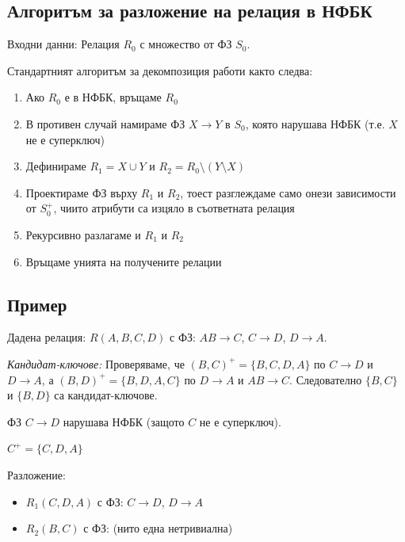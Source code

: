 \documentclass{scrartcl}
\begin{document}
\begin{FlushLeft}
\section{Алгоритъм за разложение на релация в НФБК}

Входни данни: Релация $R_0$ с множество от ФЗ $S_0$.

Стандартният алгоритъм за декомпозиция работи както следва:

\begin{enumerate}
    \item Ако $R_0$ е в НФБК, връщаме $R_0$
    
    \item В противен случай намираме ФЗ $X \rightarrow Y$ в $S_0$, която нарушава НФБК (т.е. $X$ не е суперключ)
    
    \item Дефинираме $R_1 = X \cup Y$ и $R_2 = R_0 \setminus (Y \setminus X)$
    
    \item Проектираме ФЗ върху $R_1$ и $R_2$, тоест разглеждаме само онези зависимости от $S_0^+$, чиито атрибути са изцяло в съответната релация
    
    \item Рекурсивно разлагаме и $R_1$ и $R_2$
    
    \item Връщаме унията на получените релации
\end{enumerate}

\subsection{Пример}

Дадена релация: $R(A, B, C, D)$ с ФЗ: $AB \rightarrow C$, $C \rightarrow D$, $D \rightarrow A$.

\textit{Кандидат-ключове:} Проверяваме, че $(B, C)^+ = \{B, C, D, A\}$ по $C \rightarrow D$ и $D \rightarrow A$, а $(B, D)^+ = \{B, D, A, C\}$ по $D \rightarrow A$ и $AB \rightarrow C$. Следователно $\{B, C\}$ и $\{B, D\}$ са кандидат-ключове.

ФЗ $C \rightarrow D$ нарушава НФБК (защото $C$ не е суперключ).

$C^+ = \{C, D, A\}$

Разложение:
\begin{itemize}
    \item $R_1(C, D, A)$ с ФЗ: $C \rightarrow D$, $D \rightarrow A$
    \item $R_2(B, C)$ с ФЗ: (нито една нетривиална)
\end{itemize}


\end{FlushLeft}
\end{document}

